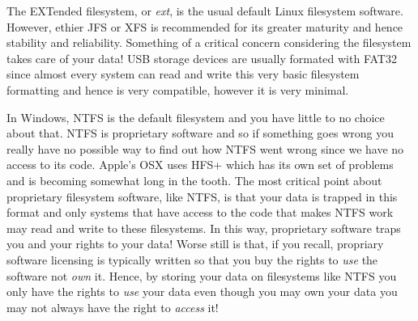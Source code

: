 The EXTended filesystem, or \emph{ext}, is the usual default Linux
filesystem software. However, ethier JFS or XFS is recommended for
its greater maturity and hence stability and reliability. Something
of a critical concern considering the filesystem takes care of your
data! USB storage devices are usually formated with FAT32 since
almost every system can read and write this very basic filesystem
formatting and hence is very compatible, however it is very minimal.

In Windows, NTFS is the default filesystem and you have little to no
choice about that. NTFS is proprietary software and so if something goes
wrong you really have no possible way to find out how NTFS went wrong
since we have no access to its code. Apple's OSX uses HFS+ which has its
own set of problems and is becoming somewhat long in the tooth. The most
critical point about proprietary filesystem software, like NTFS, is that
your data is trapped in this format and only systems that have access to
the code that makes NTFS work may read and write to these filesystems. In
this way, proprietary software traps you and your rights to your data!
Worse still is that, if you recall, propriary software licensing is typically
written so that you buy the rights to \emph{use} the software not \emph{own} it.
Hence, by storing your data on filesystems like NTFS you only have the rights
to \emph{use} your data even though you may own your data you may not always
have the right to \emph{access} it!
